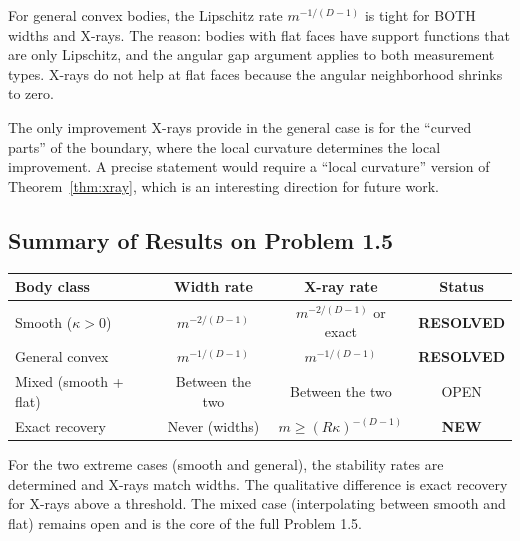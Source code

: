 \begin{remark}
For general convex bodies, the Lipschitz rate $m^{-1/(D-1)}$ is tight for BOTH widths and X-rays. The reason: bodies with flat faces have support functions that are only Lipschitz, and the angular gap argument applies to both measurement types. X-rays do not help at flat faces because the angular neighborhood shrinks to zero.

The only improvement X-rays provide in the general case is for the ``curved parts'' of the boundary, where the local curvature determines the local improvement. A precise statement would require a ``local curvature'' version of Theorem~\ref{thm:xray}, which is an interesting direction for future work.
\end{remark}


\subsection{Summary of Results on Problem 1.5}

\begin{center}
\renewcommand{\arraystretch}{1.3}
\begin{tabular}{lccc}
\toprule
\textbf{Body class} & \textbf{Width rate} & \textbf{X-ray rate} & \textbf{Status} \\
\midrule
Smooth ($\kappa > 0$) & $m^{-2/(D-1)}$ & $m^{-2/(D-1)}$ or exact & \textbf{RESOLVED} \\
General convex & $m^{-1/(D-1)}$ & $m^{-1/(D-1)}$ & \textbf{RESOLVED} \\
Mixed (smooth + flat) & Between the two & Between the two & OPEN \\
\midrule
Exact recovery & Never (widths) & $m \geq (R\kappa)^{-(D-1)}$ & \textbf{NEW} \\
\bottomrule
\end{tabular}
\end{center}

For the two extreme cases (smooth and general), the stability rates are determined and X-rays match widths. The qualitative difference is exact recovery for X-rays above a threshold. The mixed case (interpolating between smooth and flat) remains open and is the core of the full Problem 1.5.
